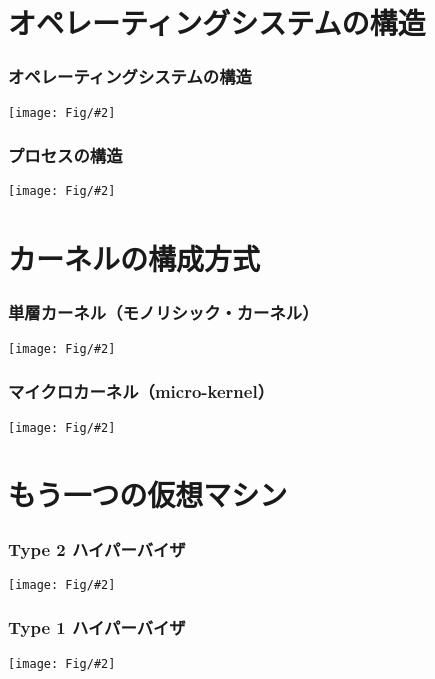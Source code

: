 \documentclass[dvipdfmx]{beamer}
\newcommand{\fig}[2]{\begin{center}\texttt{[image: Fig/\#2]}\end{center}}
\begin{document}
\section{オペレーティングシステムの構造}
\begin{frame}
  \frametitle{オペレーティングシステムの構造}
  \fig{scale=0.49}{osOrganization-crop.pdf}
\end{frame}

\begin{frame}
  \frametitle{プロセスの構造}
  \fig{scale=0.5}{procOrganization-crop.pdf}
\end{frame}

\section{カーネルの構成方式}
\begin{frame}
  \frametitle{単層カーネル（モノリシック・カーネル）}
  \fig{scale=0.49}{osOrganization-crop.pdf}
\end{frame}

\begin{frame}
  \frametitle{マイクロカーネル（micro-kernel）}
  \fig{scale=0.5}{microkernel-crop.pdf}
\end{frame}

\section{もう一つの仮想マシン}
\begin{frame}
  \frametitle{Type 2 ハイパーバイザ}
  \fig{scale=0.6}{type2Hypervisor-crop.pdf}
\end{frame}

\begin{frame}
  \frametitle{Type 1 ハイパーバイザ}
  \fig{scale=0.6}{type1Hypervisor-crop.pdf}
\end{frame}
\end{document}

